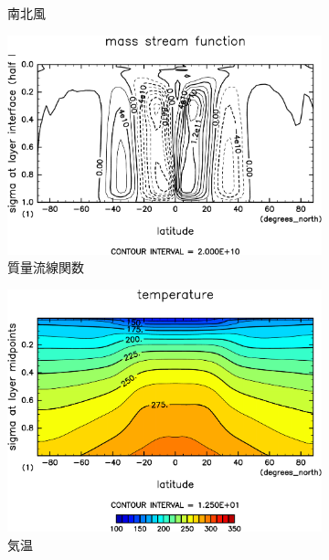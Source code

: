 \documentclass[body]{subfiles}
\begin{document}
\begin{figure}[t]
\begin{subfigure}{.4\textwidth}
		\caption{南北風\hmu*{[m/s]}}\label{S1366南北風}
	\end{subfigure}
	\begin{subfigure}{.4\textwidth}
		\centering
		\includegraphics[width=\columnwidth]{S1366/MSF,time=14600:14965-crop-rotate.pdf}
		\caption{質量流線関数\hmu*{[kg/s]}}\label{S1366質量流線関数}
	\end{subfigure}
	\begin{subfigure}{.4\textwidth}
		\centering
		\includegraphics[width=\columnwidth]{S1366/Temp,time=14600:14965-crop-rotate.pdf}
		\caption{気温\hmu*{[K]}}\label{S1366気温分布}
	\end{subfigure}
	\begin{subfigure}{.4\textwidth}
		\centering

\end{subfigure}
\end{figure}
\end{document}
